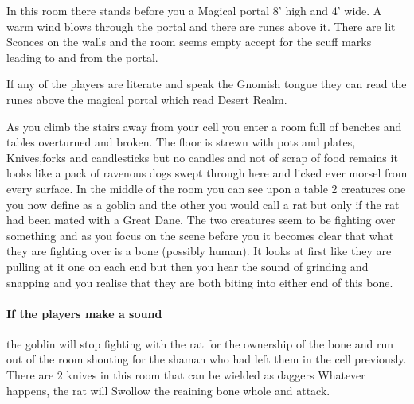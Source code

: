 \begin{multicols}{2}
\begin{boxtext}
	In this room there stands before you a Magical portal 8' high and 4' wide.
	A warm wind blows through the portal and there are runes above it.
	There are lit Sconces on the walls and the room seems empty accept for the scuff marks leading to and from the portal. 

\end{boxtext}

If any of the players are literate and speak the Gnomish tongue they can read the runes above the magical portal which read Desert Realm.


\begin{boxtext}

As you climb the stairs away from your cell you enter a room full of benches and tables overturned and broken. 
The floor is strewn with pots and plates, Knives,forks and candlesticks but no candles and not of scrap of food remains it looks like a pack of ravenous dogs swept through here and licked ever morsel from every surface.
In the middle of the room you can see upon a table 2 creatures one you now define as a goblin and the other you would call a rat but only if the rat had been mated with a Great Dane.
The two creatures seem to be fighting over something and as you focus on the scene before you it becomes clear that what they are fighting over is a bone (possibly human).
It looks at first like they are pulling at it one on each end but then you hear the sound of grinding and snapping and you realise that they are both biting into either end of this bone.

\end{boxtext}

\paragraph{If the players make a sound}
the goblin will stop fighting with the rat for the ownership of the bone and run out of the room shouting for the shaman who had left them in the cell previously.
There are 2 knives in this room that can be wielded as daggers 
Whatever happens, the rat will Swollow the reaining bone whole and attack.




\begin{boxtext}


\end{boxtext}
\end{multicols}
